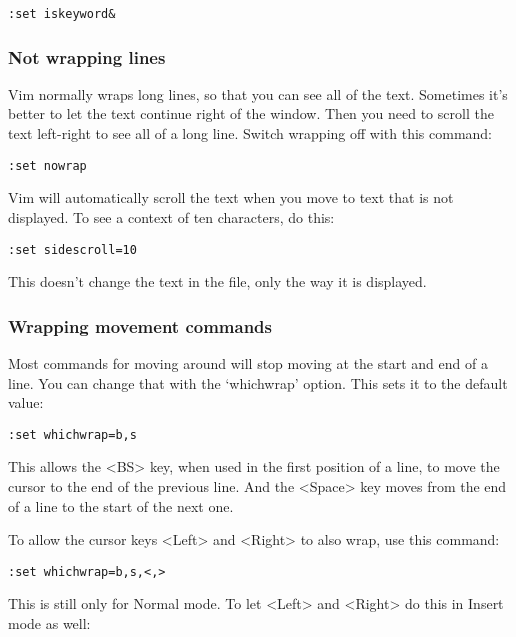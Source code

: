  \begin{Verbatim}[samepage=true]
 :set iskeyword&
 \end{Verbatim}

\subsubsection{Not wrapping lines}

Vim normally wraps long lines, so that you can see all of the text.
Sometimes it's better to let the text continue right of the window.
Then you need to scroll the text left-right to see all of a long line.
Switch wrapping off with this command:

 \begin{Verbatim}[samepage=true]
 :set nowrap
 \end{Verbatim}

Vim will automatically scroll the text when you move to text that is not displayed.
To see a context of ten characters, do this:

 \begin{Verbatim}[samepage=true]
 :set sidescroll=10
 \end{Verbatim}

This doesn't change the text in the file, only the way it is displayed.

\subsubsection{Wrapping movement commands}

Most commands for moving around will stop moving at the start and end of a line.
You can change that with the `whichwrap' option.
This sets it to the default value:

 \begin{Verbatim}[samepage=true]
 :set whichwrap=b,s
 \end{Verbatim}

This allows the <BS> key, when used in the first position of a line, to move the cursor to the end of the previous line.
And the <Space> key moves from the end of a line to the start of the next one.

To allow the cursor keys <Left> and <Right> to also wrap, use this command:

 \begin{Verbatim}[samepage=true]
 :set whichwrap=b,s,<,>
 \end{Verbatim}

This is still only for Normal mode.
To let <Left> and <Right> do this in Insert mode as well:

